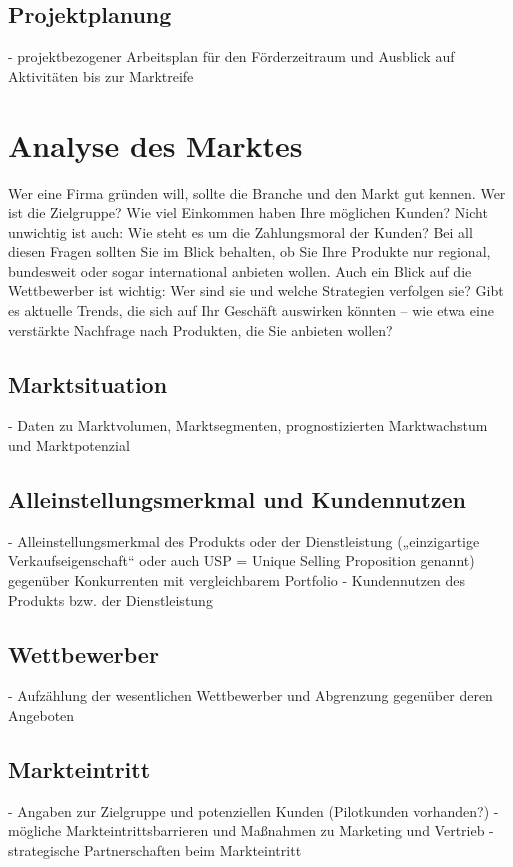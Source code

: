 \documentclass[12pt, a4paper]{article} %
\begin{document}
\subsection{Projektplanung}
- projektbezogener Arbeitsplan für den Förderzeitraum und Ausblick auf Aktivitäten bis zur Marktreife
\newpage


\section{Analyse des Marktes}

Wer eine Firma gründen will, sollte die Branche und den Markt gut kennen. Wer ist die Zielgruppe? Wie viel Einkommen haben Ihre möglichen Kunden? Nicht unwichtig ist auch: Wie steht es um die Zahlungsmoral der Kunden? Bei all diesen Fragen sollten Sie im Blick behalten, ob Sie Ihre Produkte nur regional, bundesweit oder sogar international anbieten wollen. Auch ein Blick auf die Wettbewerber ist wichtig: Wer sind sie und welche Strategien verfolgen sie? Gibt es aktuelle Trends, die sich auf Ihr Geschäft auswirken könnten – wie etwa eine verstärkte Nachfrage nach Produkten, die Sie anbieten wollen?

\subsection{Marktsituation}
- Daten zu Marktvolumen, Marktsegmenten, prognostizierten Marktwachstum und Marktpotenzial 

\subsection{Alleinstellungsmerkmal und Kundennutzen}
- Alleinstellungsmerkmal des Produkts oder der Dienstleistung („einzigartige Verkaufseigenschaft“ oder auch USP = Unique Selling Proposition genannt) gegenüber Konkurrenten mit vergleichbarem Portfolio
- Kundennutzen des Produkts bzw. der Dienstleistung

\subsection{Wettbewerber}
- Aufzählung der wesentlichen Wettbewerber und Abgrenzung gegenüber deren Angeboten 

\subsection{Markteintritt}
- Angaben zur Zielgruppe und potenziellen Kunden (Pilotkunden vorhanden?)
- mögliche Markteintrittsbarrieren und Maßnahmen zu Marketing und Vertrieb
- strategische Partnerschaften beim Markteintritt
\end{document}
